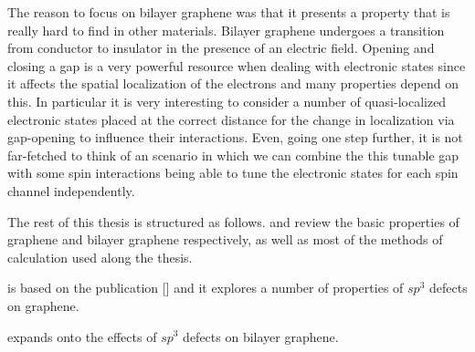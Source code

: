 


The reason to focus on bilayer graphene was that it presents a property that is really hard to find in other materials. Bilayer graphene undergoes a transition from conductor to insulator in the presence of an electric field.
Opening and closing a gap is a very powerful resource when dealing with electronic states since it affects the spatial localization of the electrons and many properties depend on this. In particular it is very interesting to consider a number of quasi-localized electronic states placed at the correct distance for the change in localization via gap-opening to influence their interactions.
Even, going one step further, it is not far-fetched to think of an scenario in which we can combine the this tunable gap with some spin interactions being able to tune the electronic states for each spin channel independently.
\bigskip


%


\bigskip
\bigskip
The rest of this thesis is structured as follows.  and  review the basic properties of graphene and bilayer graphene respectively, as well as most of the methods of calculation used along the thesis.

 is based on the publication [\cite{Garcia-Martinez2017}] and it explores a number of properties of $sp^3$ defects on graphene.

 expands onto the effects of $sp^3$ defects on bilayer graphene.

